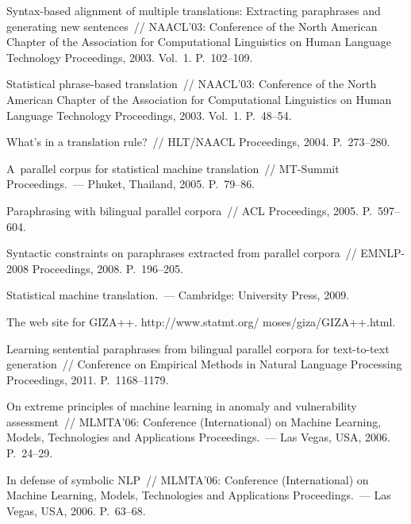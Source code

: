 \begin{multicols}{2}
{{\begin{thebibliography}{99}
 Syntax-based alignment of multiple translations: Extracting
paraphrases and generating new sentences~// NAACL'03: Conference of the North American Chapter
of the Association for Computational Linguistics on Human Language Technology Proceedings, 2003.
Vol.~1. P.~102--109.

 Statistical phrase-based translation~// NAACL'03:  Conference
of the North American Chapter of the Association for Computational Linguistics on Human Language
Technology Proceedings, 2003. Vol.~1. P.~48--54.

What's in a translation rule?~// HLT/NAACL Proceedings, 2004. P.~273--280.

 A~parallel corpus for statistical machine translation~//
MT-Summit Proceedings.~--- Phuket, Thailand, 2005. P.~79--86.

 Paraphrasing with bilingual parallel corpora~// ACL Proceedings,
2005. P.~597--604.

 Syntactic constraints on paraphrases extracted from parallel corpora~//
EMNLP-2008 Proceedings, 2008. P.~196--205.

 Statistical machine translation.~---
Cambridge: University Press, 2009.

The web site for GIZA++. {\sf http://www.statmt.org/ moses/giza/GIZA++.html}.

 Learning sentential
paraphrases from bilingual parallel corpora for text-to-text generation~// Conference on Empirical
Methods in Natural Language Processing Proceedings, 2011. P.~1168--1179.

 On extreme principles of machine learning in anomaly and
vulnerability assessment~// MLMTA'06: Conference (International) on Machine Learning, Models,
Technologies and Applications Proceedings.~--- Las Vegas, USA, 2006. P.~24--29.

\label{end\stat}

 In defense of symbolic NLP~// MLMTA'06: Conference (International) on
Machine Learning, Models, Technologies and Applications Proceedings.~--- Las Vegas, USA, 2006.
P.~63--68.

\end{thebibliography}
}
}

\end{multicols}